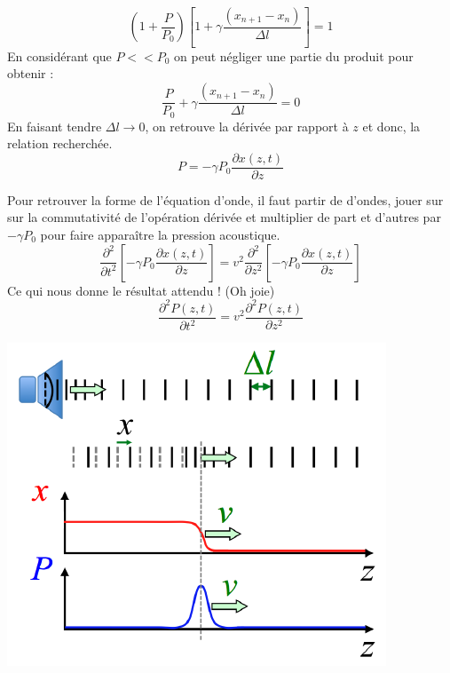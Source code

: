 \documentclass	[11pt, a4paper, openany]{book}
\begin{document}
		\begin{equation}
			\left(1 + \frac{P}{P_0}\right)\left[1 + \gamma\frac{(x_{n+1} - x_n)}{\Delta l}\right] = 1
		\end{equation}
		En considérant que $P << P_0$ on peut négliger une partie du produit pour obtenir :
		\begin{equation}
			\frac{P}{P_0} + \gamma\frac{(x_{n+1} - x_n)}{\Delta l} = 0
		\end{equation}
		En faisant tendre $\Delta l \rightarrow 0$, on retrouve la dérivée par rapport à $z$ et donc, la relation recherchée.
		\begin{equation}
			P = -\gamma P_0\frac{\partial x(z, t)}{\partial z}
		\end{equation}
		
		Pour retrouver la forme de l'équation d'onde, il faut partir de d'ondes, jouer sur sur la commutativité de l'opération dérivée et multiplier de part et d'autres par $-\gamma P_0$ pour faire apparaître la pression acoustique.
		\begin{equation}
			\frac{\partial^2}{\partial t^2}\left[-\gamma P_0\frac{\partial x(z, t)}{\partial z}\right] = v^2 \frac{\partial^2}{\partial z^2}\left[-\gamma P_0\frac{\partial x(z, t)}{\partial z}\right]
		\end{equation}
		Ce qui nous donne le résultat attendu ! (Oh joie)
		\begin{equation}
			\frac{\partial^2 P(z,t)}{\partial t^2} = v^2 \frac{\partial^2 P(z,t)}{\partial z^2}
		\end{equation}
		\begin{center}
			\includegraphics[scale=0.4]{oo/image30.png}
		\end{center}
\end{document}
